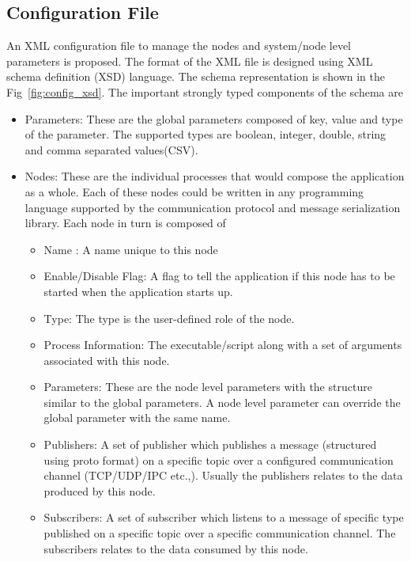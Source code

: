 \subsection{Configuration File}
\label{sec:config_file}
	An XML configuration file to manage the nodes and system/node level parameters is proposed. The format of the XML file is designed using XML schema definition (XSD) language. The schema representation is shown in the Fig~\ref{fig:config_xsd}. The important strongly typed components of the schema are
	\begin{itemize}
	\item Parameters: These are the global parameters composed of key, value and type of the parameter. The supported types are boolean, integer, double, string and comma separated values(CSV). 
	\item Nodes: These are the individual processes that would compose the application as a whole. Each of these nodes could be written in any programming language supported by the communication protocol and message serialization library. Each node in turn is composed of
	\begin{itemize}
	\item Name : A name unique to this node
	\item Enable/Disable Flag: A flag to tell the application if this node has to be started when the application starts up.
	\item Type: The type is the user-defined role of the node.
	\item Process Information: The executable/script along with a set of arguments associated with this node.
	\item Parameters: These are the node level parameters with the structure similar to the global parameters. A node level parameter can override the global parameter with the same name.
	\item Publishers: A set of publisher which publishes a message (structured using proto format) on a specific topic over a configured communication channel (TCP/UDP/IPC etc.,). Usually the publishers relates to the data produced by this node.
	\item Subscribers: A set of subscriber which listens to a message of specific type published on a specific topic over a specific communication channel. The subscribers relates to the data consumed by this node.
	\end{itemize}
	\end{itemize}
